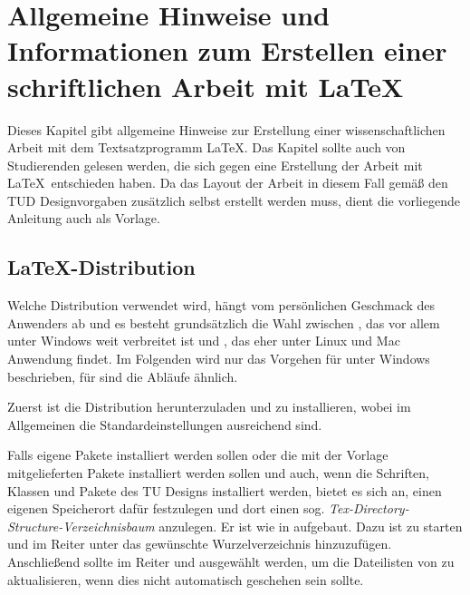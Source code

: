 \chapter{Allgemeine Hinweise und Informationen zum Erstellen einer schriftlichen Arbeit mit \LaTeX}
\label{cha:Hinweise-Latex}




Dieses Kapitel gibt allgemeine Hinweise zur Erstellung einer wissenschaftlichen Arbeit mit dem Textsatzprogramm \LaTeX. Das Kapitel sollte auch von Studierenden gelesen werden, die sich gegen eine Erstellung der Arbeit mit \LaTeX\ entschieden haben. Da das Layout der Arbeit in diesem Fall gemäß den TUD Designvorgaben zusätzlich selbst erstellt werden muss, dient die vorliegende Anleitung auch als Vorlage.



\section{\LaTeX-Distribution}
\label{sec:Distribution}
Welche Distribution verwendet wird, hängt vom persönlichen Geschmack des Anwenders ab und es besteht grundsätzlich die Wahl zwischen \Miktex{}, das vor allem unter Windows weit verbreitet ist und \texlive{}, das eher unter Linux und Mac Anwendung findet.
Im Folgenden wird nur das Vorgehen für \Miktex{} unter Windows beschrieben, für \texlive{} sind die Abläufe ähnlich.

Zuerst ist die Distribution herunterzuladen und zu installieren, wobei im Allgemeinen die Standardeinstellungen ausreichend sind.

Falls eigene Pakete installiert werden sollen oder die mit der Vorlage mitgelieferten Pakete installiert werden sollen und auch, wenn die Schriften, Klassen und Pakete des TU Designs installiert werden, bietet es sich an, einen eigenen Speicherort dafür festzulegen und dort einen sog. \emph{Tex-Directory-Structure-Verzeichnisbaum} anzulegen.
Er ist wie in  aufgebaut.
Dazu ist  zu starten und im Reiter  unter  das gewünschte Wurzelverzeichnis hinzuzufügen.
Anschließend sollte im Reiter   und  ausgewählt werden, um die Dateilisten von \Miktex{} zu aktualisieren, wenn dies nicht automatisch geschehen sein sollte.


